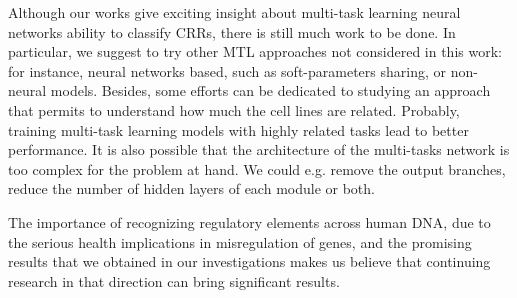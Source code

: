 Although our works give exciting insight about multi-task learning neural networks ability to classify CRRs, there is still much work to be done. In particular, we suggest to try other MTL approaches not considered in this work: for instance, neural networks based, such as soft-parameters sharing, or non-neural models. Besides, some efforts can be dedicated to studying an approach that permits to understand how much the cell lines are related. Probably, training multi-task learning models with highly related tasks lead to better performance. It is also possible that the architecture of the multi-tasks network is too complex for the problem at hand. We could e.g. remove the output branches, reduce the number of hidden layers of each module or both. 

The importance of recognizing regulatory elements across human DNA, due to the serious health implications in misregulation of genes, and the promising results that we obtained in our investigations makes us believe that continuing research in that direction can bring significant results. 
